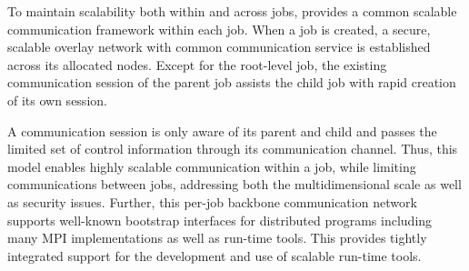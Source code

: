 
To maintain scalability both within and across jobs, \flux 
provides a common scalable communication 
framework within each job. When a job is created, a secure, scalable 
overlay network with common communication service is established 
across its allocated nodes. Except for the root-level job, 
the existing communication session of the parent job assists 
the child job with rapid creation of its own session. 

A communication session is only aware of its parent 
and child and passes the limited set of control information 
through its communication channel. Thus, this model 
enables highly scalable communication within a job, while 
limiting communications between jobs, addressing 
both the multidimensional scale as well as security issues.
Further, this per-job backbone communication network 
supports well-known bootstrap interfaces 
for distributed programs including many MPI implementations 
as well as run-time tools. This provides tightly integrated support
for the development and use of scalable run-time tools.
